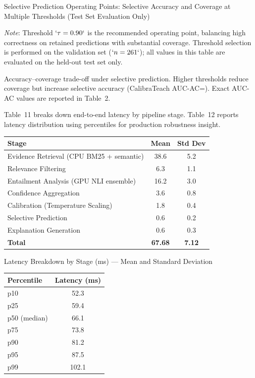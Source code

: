 Selective Prediction Operating Points: Selective Accuracy and Coverage at Multiple Thresholds (Test Set Evaluation Only)

\emph{Note}: Threshold \(`\tau=0.90`\) is the recommended operating point, balancing high correctness on retained predictions with substantial coverage. Threshold selection is performed on the validation set (\(`n=261`\)); all values in this table are evaluated on the held-out test set only.

Accuracy--coverage trade-off under selective prediction. Higher thresholds reduce coverage but increase selective accuracy (CalibraTeach AUC-AC=). Exact AUC-AC values are reported in Table~2.

Table~11 breaks down end-to-end latency by pipeline stage. Table~12 reports latency distribution using percentiles for production robustness insight.

\protect{}\label{tab:latency}
{\def\LTcaptype{none} %
\begin{longtable}[]{@{}lcc@{}}
\toprule\noalign{}
\textbf{Stage} & \textbf{Mean} & \textbf{Std Dev} \\
\midrule\noalign{}
\endhead
\bottomrule\noalign{}
\endlastfoot
Evidence Retrieval (CPU BM25 + semantic) & 38.6 & 5.2 \\
Relevance Filtering & 6.3 & 1.1 \\
Entailment Analysis (GPU NLI ensemble) & 16.2 & 3.0 \\
Confidence Aggregation & 3.6 & 0.8 \\
Calibration (Temperature Scaling) & 1.8 & 0.4 \\
Selective Prediction & 0.6 & 0.2 \\
Explanation Generation & 0.6 & 0.3 \\
\textbf{Total} & \textbf{67.68} & \textbf{7.12} \\
\end{longtable}
}

Latency Breakdown by Stage (ms) --- Mean and Standard Deviation

\protect{}\label{tab:latency_percentiles}
{\def\LTcaptype{none} %
\begin{longtable}[]{@{}lc@{}}
\toprule\noalign{}
\textbf{Percentile} & \textbf{Latency (ms)} \\
\midrule\noalign{}
\endhead
\bottomrule\noalign{}
\endlastfoot
p10 & 52.3 \\
p25 & 59.4 \\
p50 (median) & 66.1 \\
p75 & 73.8 \\
p90 & 81.2 \\
p95 & 87.5 \\
p99 & 102.1 \\
\end{longtable}
}

